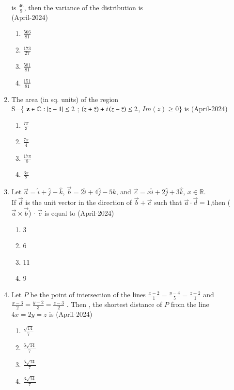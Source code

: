 \documentclass[journal,12pt,onecolumn]{IEEEtran}
\theoremstyle{remark}
\begin{document}
\begin{enumerate}
\begin{table}[h!]    
  \centering
 
\end{table}
is $\frac{46}{9}$, then the variance of the distribution is \\
\hfill{(April-2024)}
\begin{multicols}{2}
\begin{enumerate}
\item $\frac{566}{81}$
\item  $\frac{173}{27}$
\item $\frac{581}{81}$
\item $\frac{151}{81}$
\end{enumerate}
\end{multicols}
\item The area (in sq. units) of the region \\
S=\{ $\mathbf{z} \in \mathbb{C}:\left\vert z - 1\right\vert \leq 2$ ; $\left(z + \bar{z}\right) + i\left(z - \bar{z}\right) \leq 2$, $Im(z) \geq 0 \}$ is
\hfill{(April-2024)}
\begin{multicols}{2}
\begin{enumerate}
\item $\frac{7\pi}{3}$
\item $\frac{7\pi}{4}$
\item $\frac{17\pi}{8}$
\item $\frac{3\pi}{2}$
\end{enumerate}
\end{multicols}
\item Let $\vec{a} = \hat{i} + \hat{j} + \hat{k}$, $\vec{b} = 2\hat{i} + 4\hat{j} - 5\hat{k}$, and $\vec{c} = x\hat{i} + 2\hat{j} + 3\hat{k}$, $x \in \mathbb{R}$. \\
If $\vec{d}$  is the unit vector in the direction of  $\vec{b} + \vec{c}$ such that $ \vec{a} \cdot \vec{d} = 1$,then ($\vec{a} \times \vec{b}$) $\cdot$ $\vec{c}$ is equal to 
\hfill{(April-2024)}
\begin{multicols}{2}
\begin{enumerate}
\item 3
\item 6
\item 11
\item 9
\end{enumerate}
\end{multicols}

\item Let $P$ be the point of intersection of the lines $\frac{x-2}{1}=\frac{y-4}{5}=\frac{z-2}{1}$ and $\frac{x-3}{2}=\frac{y-2}{3}=\frac{z-3}{2}$ . Then , the shortest distance of $P$ from the line $4x=2y=z$ is
\hfill{(April-2024)}
\begin{enumerate}
\item $\frac{\sqrt{14}}{7}$
\item  $\frac{6\sqrt{14}}{7}$
\item $\frac{5\sqrt{14}}{7}$
\item $\frac{3\sqrt{14}}{7}$
\end{enumerate}


\end{enumerate}
\end{document}

